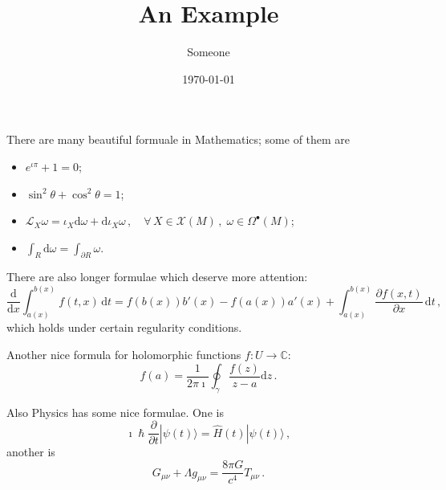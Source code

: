 \documentclass[a4paper]{article}
\title{An Example}
\author{Someone}
\date{\today}
\begin{document}
\maketitle

There are many beautiful formuale in Mathematics; some of them are
\begin{itemize}
    \item $e^{\iota\pi} + 1 = 0$;
    \item $\sin^2 \theta + \cos^2 \theta = 1$;
    \item $\mathcal{L}_X \omega = \iota_X\mathrm{d}\omega + \mathrm{d}\iota_X \omega \,, \quad \forall\, X \in \mathcal{X}(M)\,,\; \omega \in \Omega^\bullet(M)$;
    \item $\int_R \mathrm{d}\omega = \int_{\partial R} \omega$.
\end{itemize}

There are also longer formulae which deserve more attention:
$$
\frac{\mathrm{d}}{\mathrm{d}x} \int_{a(x)}^{b(x)} f(t, x)\, \mathrm{d}t = f(b(x))b'(x) - f(a(x))a'(x) + \int_{a(x)}^{b(x)}\frac{\partial f(x, t)}{\partial x}\, \mathrm{d}t\,,
$$
which holds under certain regularity conditions.

Another nice formula for holomorphic functions $f: U \rightarrow \mathbb{C}$:
$$
f(a) = \frac{1}{2\pi\imath} \oint_\gamma \frac{f(z)}{z-a}\mathrm{d}z\,.
$$

Also Physics has some nice formulae. One is
$$
\imath\hslash\frac{\partial}{\partial t} |\psi(t)\rangle = \widehat{H}(t)|\psi(t)\rangle \,,
$$
another is
$$
G_{\mu\nu} + \Lambda g_{\mu\nu} = \frac{8\pi G}{c^4}T_{\mu\nu}\,.
$$
\end{document}

